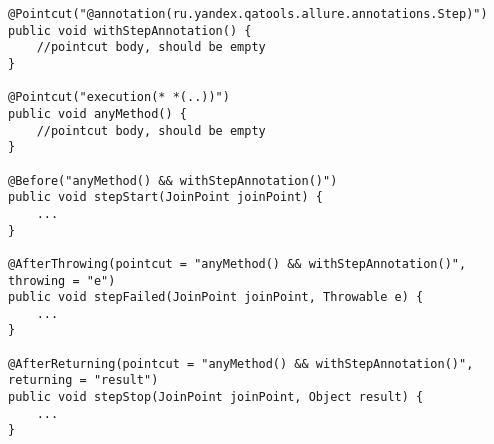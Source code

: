 \begin{lstlisting}
@Pointcut("@annotation(ru.yandex.qatools.allure.annotations.Step)")
public void withStepAnnotation() {
    //pointcut body, should be empty
}

@Pointcut("execution(* *(..))")
public void anyMethod() {
    //pointcut body, should be empty
}

@Before("anyMethod() && withStepAnnotation()")
public void stepStart(JoinPoint joinPoint) {
    ...
}

@AfterThrowing(pointcut = "anyMethod() && withStepAnnotation()", throwing = "e")
public void stepFailed(JoinPoint joinPoint, Throwable e) {
    ...
}

@AfterReturning(pointcut = "anyMethod() && withStepAnnotation()", returning = "result")
public void stepStop(JoinPoint joinPoint, Object result) {
    ...
}
\end{lstlisting}

